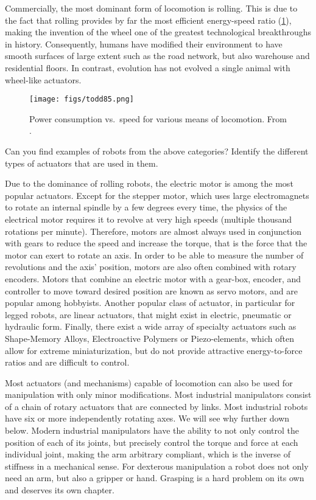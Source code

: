 Commercially, the most dominant form of locomotion is rolling. This is due to the fact that rolling provides by far the most efficient energy-speed ratio (\cref{fig:todd}), making the invention of the wheel one of the greatest technological breakthroughs in history. Consequently, humans have modified their environment to have smooth surfaces of large extent such as the road network, but also warehouse and residential floors. In contrast, evolution has not evolved a single animal with wheel-like actuators.

\begin{figure}
	\centering
		\texttt{[image: figs/todd85.png]}
	\caption{Power consumption vs.\ speed for various means of locomotion. From \protect{}.}
	\label{fig:todd}
\end{figure}


\begin{framed}Can you find examples of robots from the above categories? Identify the different types of actuators that are used in them.
\end{framed}

Due to the dominance of rolling robots, the electric motor is among the most popular actuators. Except for the stepper motor, which uses large electromagnets to rotate an internal spindle by a few degrees every time, the physics of the electrical motor requires it to revolve at very high speeds (multiple thousand rotations per minute). Therefore, motors are almost always used in conjunction with gears to reduce the speed and increase the torque, that is the force that the motor can exert to rotate an axis. In order to be able to measure the number of revolutions and the axis' position, motors are also often combined with rotary encoders. Motors that combine an electric motor with a gear-box, encoder, and controller to move toward desired position are known as servo motors, and are popular among hobbyists. Another popular class of actuator, in particular for legged robots, are linear actuators, that might exist in electric, pneumatic or hydraulic form. Finally, there exist a wide array of specialty actuators such as Shape-Memory Alloys, Electroactive Polymers or Piezo-elements, which often allow for extreme miniaturization, but do not provide attractive energy-to-force ratios and are difficult to control.

Most actuators (and mechanisms) capable of locomotion can also be used for manipulation with only minor modifications. Most industrial manipulators consist of a chain of rotary actuators that are connected by links. Most industrial robots have six or more independently rotating axes. We will see why further down below. Modern industrial manipulators have the ability to not only control the position of each of its joints, but precisely control the torque and force at each individual joint, making the arm arbitrary compliant, which is the inverse of stiffness in a mechanical sense. For dexterous manipulation a robot does not only need an arm, but also a gripper or hand. Grasping is a hard problem on its own and deserves its own chapter.

